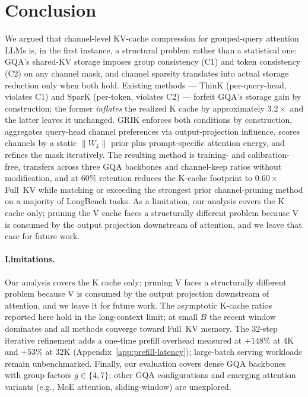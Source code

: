 \documentclass{article}
\begin{document}
 
\section{Conclusion}
\label{sec:conclusion}
 
We argued that channel-level KV-cache compression for grouped-query attention LLMs is, in the first instance, a structural problem rather than a statistical one: GQA's shared-KV storage imposes group consistency (C1) and token consistency (C2) on any channel mask, and channel sparsity translates into actual storage reduction only when both hold. Existing methods --- ThinK (per-query-head, violates C1) and SparK (per-token, violates C2) --- forfeit GQA's storage gain by construction; the former \emph{inflates} the realized K cache by approximately $3.2\times$ and the latter leaves it unchanged. GRIK enforces both conditions by construction, aggregates query-head channel preferences via output-projection influence, scores channels by a static $\|W_k\|$ prior plus prompt-specific attention energy, and refines the mask iteratively. The resulting method is training- and calibration-free, transfers across three GQA backbones and channel-keep ratios without modification, and at $60\%$ retention reduces the K-cache footprint to $0.60\times$ Full~KV while matching or exceeding the strongest prior channel-pruning method on a majority of LongBench tasks. As a limitation, our analysis covers the K cache only; pruning the V cache faces a structurally different problem because V is consumed by the output projection downstream of attention, and we leave that case for future work.

\paragraph{Limitations.} Our analysis covers the K cache only; pruning V faces a structurally different problem because V is consumed by the output projection downstream of attention, and we leave it for future work. The asymptotic K-cache ratios reported here hold in the long-context limit; at small $B$ the recent window dominates and all methods converge toward Full~KV memory. The $32$-step iterative refinement adds a one-time prefill overhead measured at $+148\%$ at 4K and $+53\%$ at 32K (Appendix~\ref{app:prefill-latency}); large-batch serving workloads remain unbenchmarked. Finally, our evaluation covers dense GQA backbones with group factors $g \in \{4, 7\}$; other GQA configurations and emerging attention variants (e.g., MoE attention, sliding-window) are unexplored.
 
\end{document}
